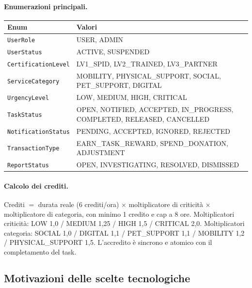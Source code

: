 \documentclass[11pt,a4paper]{article}
\begin{document}
\paragraph{Enumerazioni principali.}
\begin{xltabular}{\linewidth}{|L{4.2cm}|Y|}
\hline
{}\color{white}\bfseries Enum & \color{white}\bfseries Valori\\\hline
\endhead
\texttt{UserRole} & USER, ADMIN\\\hline
\texttt{UserStatus} & ACTIVE, SUSPENDED\\\hline
\texttt{CertificationLevel} & LV1\_SPID, LV2\_TRAINED, LV3\_PARTNER\\\hline
\texttt{ServiceCategory} & MOBILITY, PHYSICAL\_SUPPORT, SOCIAL, PET\_SUPPORT, DIGITAL\\\hline
\texttt{UrgencyLevel} & LOW, MEDIUM, HIGH, CRITICAL\\\hline
\texttt{TaskStatus} & OPEN, NOTIFIED, ACCEPTED, IN\_PROGRESS, COMPLETED, RELEASED, CANCELLED\\\hline
\texttt{NotificationStatus} & PENDING, ACCEPTED, IGNORED, REJECTED\\\hline
\texttt{TransactionType} & EARN\_TASK\_REWARD, SPEND\_DONATION, ADJUSTMENT\\\hline
\texttt{ReportStatus} & OPEN, INVESTIGATING, RESOLVED, DISMISSED\\\hline
\end{xltabular}

\paragraph{Calcolo dei crediti.} Crediti $=$ durata reale ($6$ crediti/ora) $\times$ moltiplicatore di criticit\`a $\times$ moltiplicatore di categoria, con minimo 1 credito e cap a 8 ore. Moltiplicatori criticit\`a: LOW 1,0 / MEDIUM 1,25 / HIGH 1,5 / CRITICAL 2,0. Moltiplicatori categoria: SOCIAL 1,0 / DIGITAL 1,1 / PET\_SUPPORT 1,1 / MOBILITY 1,2 / PHYSICAL\_SUPPORT 1,5. L'accredito \`e sincrono e atomico con il completamento del task.

\subsection{Motivazioni delle scelte tecnologiche}
\end{document}
